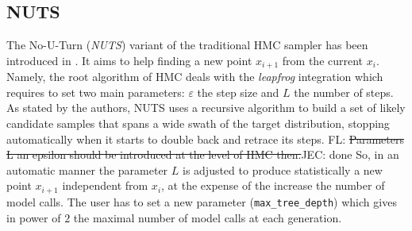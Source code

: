 \documentclass[twocolumn,twocolappendix,nofootinbib,iop]{openjournal}
\newcommand{\FrL}[1]{{\color{cyan}FL: #1}}
\newcommand{\JEC}[1]{{\color{magenta}JEC: #1}}
\begin{document}
\subsection{NUTS}
\label{sec-NUTS}
%

The No-U-Turn (\textit{NUTS})  variant of the traditional HMC sampler has been introduced in \citet{nuts}. It aims to help finding a new point  $x_{i+1}$ from  the current $x_i$. Namely, the root algorithm of HMC deals with the \textit{leapfrog} integration which requires to set two main parameters: $\varepsilon$ the step size and $L$ the number of steps. As stated by the authors, NUTS  uses a recursive algorithm to build a set of likely candidate samples that spans a wide swath of the target distribution, stopping automatically when it starts to double back and retrace its steps. \FrL{\st{Parameters L an epsilon should be introduced at the level of HMC then.}}\JEC{done} So, in an automatic manner the parameter $L$ is adjusted to produce statistically  a new point $x_{i+1}$ independent from $x_i$, at the expense of the increase the number of model calls. The user has to set a new  parameter  (\texttt{max\_tree\_depth}) which gives in power of $2$ the maximal number of model calls at each generation.
\end{document}
